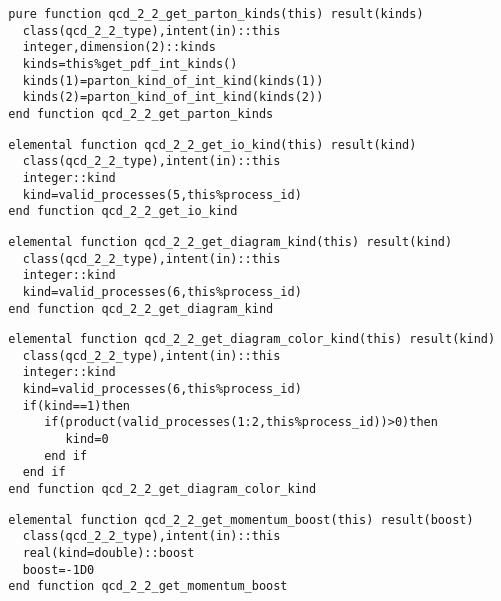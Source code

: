 \begin{Verbatim}
  pure function qcd_2_2_get_parton_kinds(this) result(kinds)
    class(qcd_2_2_type),intent(in)::this
    integer,dimension(2)::kinds
    kinds=this%get_pdf_int_kinds()
    kinds(1)=parton_kind_of_int_kind(kinds(1))
    kinds(2)=parton_kind_of_int_kind(kinds(2))
  end function qcd_2_2_get_parton_kinds
\end{Verbatim}

\begin{Verbatim}
  elemental function qcd_2_2_get_io_kind(this) result(kind)
    class(qcd_2_2_type),intent(in)::this
    integer::kind
    kind=valid_processes(5,this%process_id)
  end function qcd_2_2_get_io_kind
\end{Verbatim}

\begin{Verbatim}
  elemental function qcd_2_2_get_diagram_kind(this) result(kind)
    class(qcd_2_2_type),intent(in)::this
    integer::kind
    kind=valid_processes(6,this%process_id)
  end function qcd_2_2_get_diagram_kind
\end{Verbatim}


\begin{Verbatim}
  elemental function qcd_2_2_get_diagram_color_kind(this) result(kind)
    class(qcd_2_2_type),intent(in)::this
    integer::kind
    kind=valid_processes(6,this%process_id)
    if(kind==1)then
       if(product(valid_processes(1:2,this%process_id))>0)then
          kind=0
       end if
    end if
  end function qcd_2_2_get_diagram_color_kind
\end{Verbatim}


\begin{Verbatim}
  elemental function qcd_2_2_get_momentum_boost(this) result(boost)
    class(qcd_2_2_type),intent(in)::this
    real(kind=double)::boost
    boost=-1D0
  end function qcd_2_2_get_momentum_boost
\end{Verbatim}

